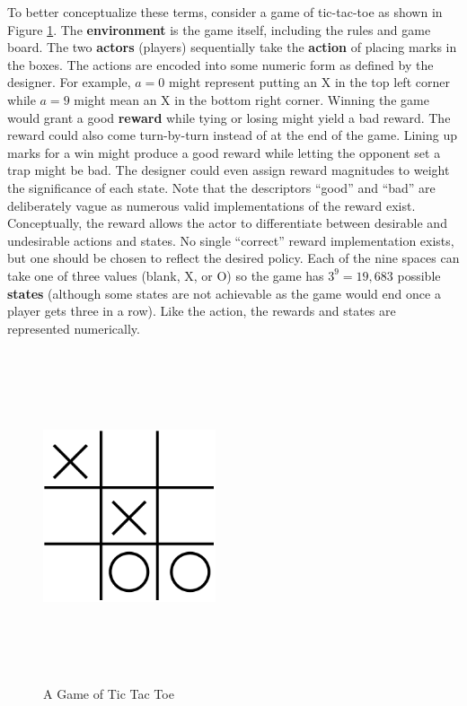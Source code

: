 To better conceptualize these terms, consider a game of tic-tac-toe as shown in Figure \ref{fig:tictactoe}. The \textbf{environment} is the game itself, including the rules and game board. The two \textbf{actors} (players) sequentially take the \textbf{action} of placing marks in the boxes. The actions are encoded into some numeric form as defined by the designer. For example, $a=0$ might represent putting an X in the top left corner while $a=9$ might mean an X in the bottom right corner. Winning the game would grant a good \textbf{reward} while tying or losing might yield a bad reward. The reward could also come turn-by-turn instead of at the end of the game. Lining up marks for a win might produce a good reward while letting the opponent set a trap might be bad. The designer could even assign reward magnitudes to weight the significance of each state. Note that the descriptors ``good'' and ``bad'' are deliberately vague as numerous valid implementations of the reward exist. Conceptually, the reward allows the actor to differentiate between desirable and undesirable actions and states. No single ``correct'' reward implementation exists, but one should be chosen to reflect the desired policy. Each of the nine spaces can take one of three values (blank, X, or O) so the game has $3^9=19,683$ possible \textbf{states} (although some states are not achievable as the game would end once a player gets three in a row). Like the action, the rewards and states are represented numerically.
\begin{figure}[H]   %
	\centering \includegraphics[width=2in, height=3.85in, keepaspectratio]{figures/tictactoe.pdf}
	\caption{A Game of Tic Tac Toe}\label{fig:tictactoe}
\end{figure}

